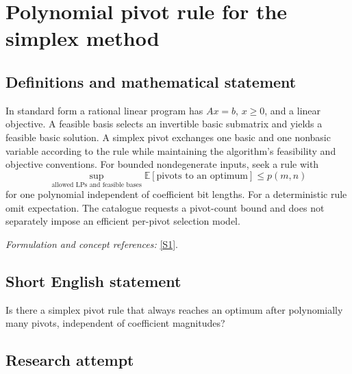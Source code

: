 \documentclass[11pt,a4paper]{article}
\newcommand{\sref}[2]{\hyperlink{source:#1:#2}{[S#2]}}
\newif\ifshowcatalogue
\newcommand{\cataloguescope}[1]{\ifshowcatalogue
 \paragraph{Exact scope in the supplied catalogue.}
 \begin{quote}\small #1\end{quote}\fi}
\numberwithin{equation}{section}
\begin{document}
\setcounter{section}{0}
\clearpage
\section*{\texorpdfstring{Polynomial pivot rule for the simplex method}{Polynomial pivot rule for the simplex method}}\label{statement}
\subsection{Definitions and mathematical statement}
In standard form a rational linear program has $Ax=b$, $x\ge0$, and a linear objective. A feasible basis selects an invertible basic submatrix and yields a feasible basic solution. A simplex pivot exchanges one basic and one nonbasic variable according to the rule while maintaining the algorithm's feasibility and objective conventions. For bounded nondegenerate inputs, seek a rule with
\[
 \sup_{\text{allowed LPs and feasible bases}}\mathbb E[\text{pivots to an optimum}]
 \le p(m,n)
\]
for one polynomial independent of coefficient bit lengths. For a deterministic rule omit expectation. The catalogue requests a pivot-count bound and does not separately impose an efficient per-pivot selection model.
\par\smallskip\textit{Formulation and concept references:} \sref{statement}{1}.
\cataloguescope{Construct a deterministic or randomized simplex pivot rule and a polynomial p such that, for every bounded nondegenerate rational linear program with m equality constraints and n variables and every feasible starting basis, the rule reaches an optimal basis in at most p(m,n) pivots, in expectation when the rule is randomized; or prove that no such rule exists.}
\subsection{Short English statement}
Is there a simplex pivot rule that always reaches an optimum after polynomially many pivots, independent of coefficient magnitudes?
\subsection{Research attempt}
\end{document}
